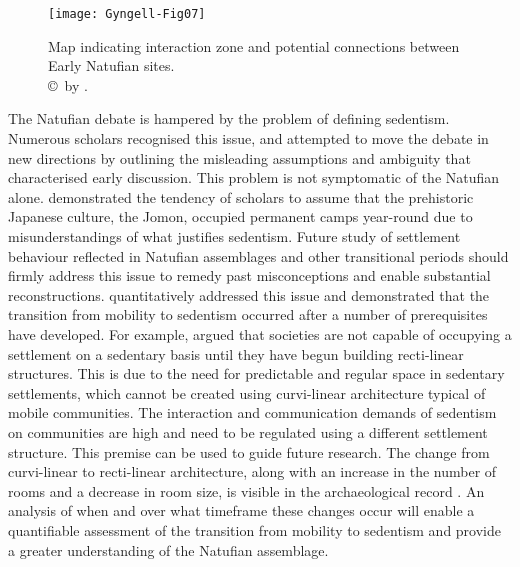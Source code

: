 \documentclass[%
	]{ijsra}
\begin{document}
\begin{figure}[!htb] %
	\texttt{[image: Gyngell-Fig07]}
	\caption{Map indicating interaction zone and potential connections between Early Natufian sites.
		{\normalfont\scriptsize \\ \copyright\ by 
			 \textcite{Edwards_2015}.
		}}
		\label{fig:Gyngell-Fig07}
	\end{figure}


The Natufian debate is hampered by the problem of defining sedentism. Numerous scholars recognised this issue, and attempted to move the debate in new directions by outlining the misleading assumptions and ambiguity that characterised early discussion. This problem is not symptomatic of the Natufian alone. 
\textcite{Habu_1996} demonstrated the tendency of scholars to assume that the prehistoric Japanese culture, the Jomon, occupied permanent camps year-round due to misunderstandings of what justifies sedentism. Future study of settlement behaviour reflected in Natufian assemblages and other transitional periods should firmly address this issue to remedy past misconceptions and enable substantial reconstructions. 
\textcite{Fletcher_2007} quantitatively addressed this issue and demonstrated that the transition from mobility to sedentism occurred after a number of prerequisites have developed. 
For example, \textcite{Fletcher_2007} argued that societies are not capable of occupying a settlement on a sedentary basis until they have begun building recti-linear structures. This is due to the need for predictable and regular space in sedentary settlements, which cannot be created using curvi-linear architecture typical of mobile communities. The interaction and communication demands of sedentism on communities are high and need to be regulated using a different settlement structure. This premise can be used to guide future research. 
The change from curvi-linear to recti-linear architecture, along with an increase in the number of rooms and a decrease in room size, is visible in the archaeological record \parencite{Byrd_2005}. An analysis of when and over what timeframe these changes occur will enable a quantifiable assessment of the transition from mobility to sedentism and provide a greater understanding of the Natufian assemblage.
\end{document}
